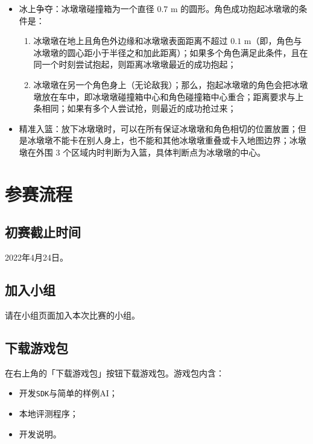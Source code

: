 \documentclass[UTF8]{article}
\begin{document}
\begin{itemize}
\item
  冰上争夺：冰墩墩碰撞箱为一个直径 \(0.7\text{ m}\)
  的圆形。角色成功抱起冰墩墩的条件是：

  \begin{enumerate}
  \def\labelenumi{\arabic{enumi}.}
  \item
    冰墩墩在地上且角色外边缘和冰墩墩表面距离不超过
    \(0.1\text{ m}\)（即，角色与冰墩墩的圆心距小于半径之和加此距离）；如果多个角色满足此条件，且在同一个时刻尝试抱起，则距离冰墩墩最近的成功抱起；
  \item
    冰墩墩在另一个角色身上（无论敌我）；那么，抱起冰墩墩的角色会把冰墩墩放在车中，即冰墩墩碰撞箱中心和角色碰撞箱中心重合；距离要求与上条相同；如果有多个人尝试抢，则最近的成功抢过来；
  \end{enumerate}
\item
  精准入篮：放下冰墩墩时，可以在所有保证冰墩墩和角色相切的位置放置；但是冰墩墩不能卡在别人身上，也不能和其他冰墩墩重叠或卡入地图边界；冰墩墩在外围
  \(3\) 个区域内时判断为入篮，具体判断点为冰墩墩的中心。
\end{itemize}

\hypertarget{header-n26}{%
\section{参赛流程}\label{header-n26}}

\hypertarget{header-n27}{%
\subsection{初赛截止时间}\label{header-n27}}

2022年4月24日。

\hypertarget{header-n27}{%
\subsection{加入小组}\label{header-n28}}

请在小组页面加入本次比赛的小组。

\hypertarget{header-n29}{%
\subsection{下载游戏包}\label{header-n29}}

在右上角的「下载游戏包」按钮下载游戏包。游戏包内含：

\begin{itemize}
\item
  开发\texttt{SDK}与简单的样例AI；
\item
  本地评测程序；
\item
  开发说明。
\end{itemize}
\end{document}
